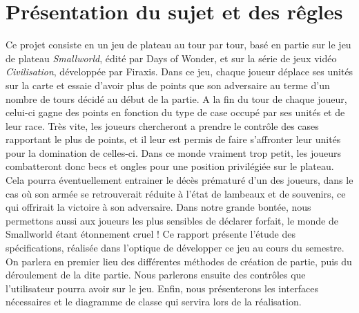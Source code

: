 \section{Présentation du sujet et des rêgles}
Ce projet consiste en un jeu de plateau au tour par tour, basé en partie sur le jeu de plateau \textit{Smallworld}, édité par Days of Wonder, et sur la série de jeux vidéo \textit{Civilisation}, développée par Firaxis.  
Dans ce jeu, chaque joueur déplace ses unités sur la carte et essaie d'avoir plus de points que son adversaire au terme d'un nombre de tours décidé au début de la partie.
A la fin du tour de chaque joueur, celui-ci gagne des points en fonction du type de case occupé par ses unités et de leur race.
\newline
\newline
Très vite, les joueurs chercheront a prendre le contrôle des cases rapportant le plus de points, et il leur est permis de faire s'affronter leur unités pour la domination de celles-ci.
Dans ce monde vraiment trop petit, les joueurs combatteront donc becs et ongles pour une position privilégiée sur le plateau. 
Cela pourra éventuellement entrainer le décès prématuré d'un des joueurs, dans le cas où son armée se retrouverait réduite à l'état de lambeaux et de souvenirs, ce qui offrirait la victoire à son adversaire.
Dans notre grande bontée, nous permettons aussi aux joueurs les plus sensibles de déclarer forfait, le monde de Smallworld étant étonnement cruel !
\newline
\newline
Ce rapport présente l'étude des spécifications, réalisée dans l'optique de développer ce jeu au cours du semestre.
On parlera en premier lieu des différentes méthodes de création de partie, puis du déroulement de la dite partie.
Nous parlerons ensuite des contrôles que l'utilisateur pourra avoir sur le jeu.
Enfin, nous présenterons les interfaces nécessaires et le diagramme de classe qui servira lors de la réalisation.